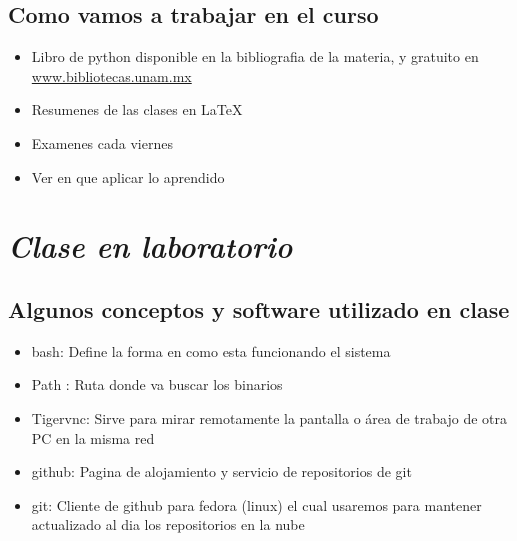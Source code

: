 \documentclass{book}
\begin{document}
	\subsection {Como vamos a trabajar en el curso}
	\begin{itemize}
		\item Libro de python disponible en la bibliografia de la materia, y gratuito en \url{www.bibliotecas.unam.mx}
		\item Resumenes de las clases en LaTeX
		\item Examenes cada viernes
		\item Ver en que aplicar lo aprendido
	\end{itemize}
	
	
	
	






\section{\textit{Clase en laboratorio}}%
\begin{flushright}
	\date{08 de enero de 2019}  %
\end{flushright}


	
	\subsection {Algunos conceptos y software utilizado en clase}%
	\begin{itemize}
		\item bash: Define la forma en como esta funcionando el sistema
		\item Path : Ruta donde va buscar los binarios
		\item Tigervnc: Sirve para mirar remotamente la pantalla o área de trabajo de otra PC en la misma red
		\item github: Pagina de alojamiento y servicio de repositorios de git
		\item git: Cliente de github para fedora (linux) el cual usaremos para mantener actualizado al dia los repositorios en la nube
		
	\end{itemize}
	
\end{document}
